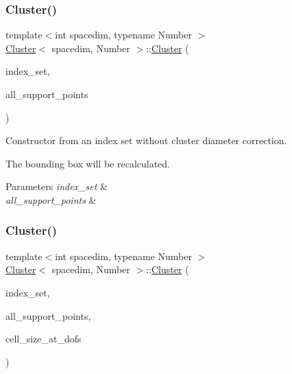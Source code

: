 \subsubsection{\texorpdfstring{Cluster()}{Cluster()}\hspace{0.1cm}{\footnotesize\ttfamily [3/7]}}
{\footnotesize\ttfamily template$<$int spacedim, typename Number $>$ \\
\hyperlink{classCluster}{Cluster}$<$ spacedim, Number $>$\+::\hyperlink{classCluster}{Cluster} (\begin{DoxyParamCaption}\item[{const std\+::vector$<$ types\+::global\+\_\+dof\+\_\+index $>$ \&}]{index\+\_\+set,  }\item[{const std\+::vector$<$ Point$<$ spacedim, Number $>$$>$ \&}]{all\+\_\+support\+\_\+points }\end{DoxyParamCaption})}

Constructor from an index set without cluster diameter correction.

The bounding box will be recalculated. 
\begin{DoxyParams}{Parameters}
{\em index\+\_\+set} & \\
\hline
{\em all\+\_\+support\+\_\+points} & \\
\hline
\end{DoxyParams}
\mbox{\label{classCluster_a07a5837c2f6c0b676ca45b826e51b460}} 
\subsubsection{\texorpdfstring{Cluster()}{Cluster()}\hspace{0.1cm}{\footnotesize\ttfamily [4/7]}}
{\footnotesize\ttfamily template$<$int spacedim, typename Number $>$ \\
\hyperlink{classCluster}{Cluster}$<$ spacedim, Number $>$\+::\hyperlink{classCluster}{Cluster} (\begin{DoxyParamCaption}\item[{const std\+::vector$<$ types\+::global\+\_\+dof\+\_\+index $>$ \&}]{index\+\_\+set,  }\item[{const std\+::vector$<$ Point$<$ spacedim, Number $>$$>$ \&}]{all\+\_\+support\+\_\+points,  }\item[{const std\+::vector$<$ Number $>$ \&}]{cell\+\_\+size\+\_\+at\+\_\+dofs }\end{DoxyParamCaption})}

